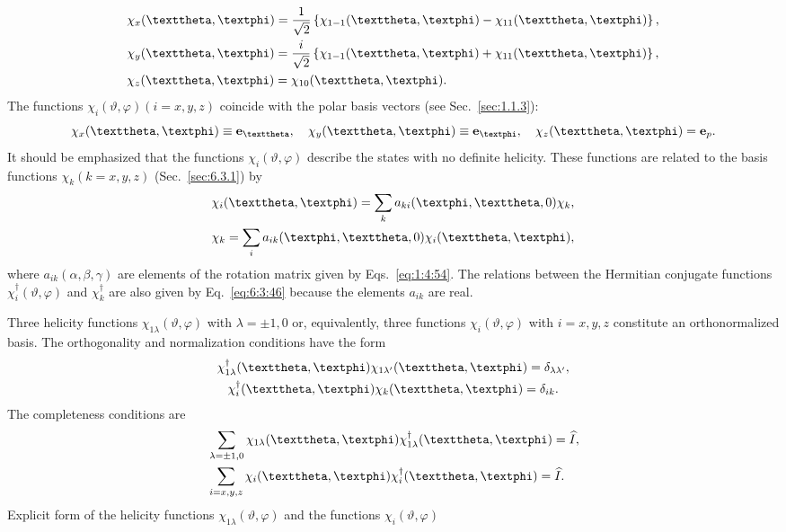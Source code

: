 \begin{align}
& \chi_{x}(\vartheta, \varphi)=\frac{1}{\sqrt{2}}\left\{\chi_{1-1}(\vartheta, \varphi)-\chi_{11}(\vartheta, \varphi)\right\}, \notag\\
& \chi_{y}(\vartheta, \varphi)=\frac{i}{\sqrt{2}}\left\{\chi_{1-1}(\vartheta, \varphi)+\chi_{11}(\vartheta, \varphi)\right\}, \label{eq:6:3:44}\\
& \chi_{z}(\vartheta, \varphi)=\chi_{10}(\vartheta, \varphi) . \notag
\end{align}
The functions $\chi_{i}(\vartheta, \varphi)(i=x, y, z)$ coincide with the polar basis vectors (see Sec.~\ref{sec:1.1.3}):
\begin{equation}
\chi_{x}(\vartheta, \varphi) \equiv \vect{e}_{\vartheta}, \quad \chi_{y}(\vartheta, \varphi) \equiv \vect{e}_{\varphi}, \quad \chi_{z}(\vartheta, \varphi)=\vect{e}_{p}. \label{eq:6:3:45}
\end{equation}
It should be emphasized that the functions $\chi_{i}(\vartheta, \varphi)$ describe the states with no definite helicity. These functions are related to the basis functions $\chi_{k}(k=x, y, z)$ (Sec.~\ref{sec:6.3.1}) by
\begin{align}
& \chi_{i}(\vartheta, \varphi)=\sum_{k} a_{k i}(\varphi, \vartheta, 0) \chi_{k}, \notag\\
& \chi_{k}=\sum_{i} a_{i k}(\varphi, \vartheta, 0) \chi_{i}(\vartheta, \varphi), \label{eq:6:3:46}
\end{align}
where $a_{i k}(\alpha, \beta, \gamma)$ are elements of the rotation matrix given by Eqs.~\eqref{eq:1:4:54}. The relations between the Hermitian conjugate functions $\chi_{i}^{\dagger}(\vartheta, \varphi)$ and $\chi_{k}^{\dagger}$ are also given by Eq.~\eqref{eq:6:3:46} because the elements $a_{i k}$ are real.

Three helicity functions $\chi_{1 \lambda}(\vartheta, \varphi)$ with $\lambda= \pm 1,0$ or, equivalently, three functions $\chi_{i}(\vartheta, \varphi)$ with $i=x, y, z$ constitute an orthonormalized basis. The orthogonality and normalization conditions have the form
\begin{gather}
\chi_{1 \lambda}^{\dagger}(\vartheta, \varphi) \chi_{1 \lambda^{\prime}}(\vartheta, \varphi)=\delta_{\lambda \lambda^{\prime}}, \notag\\
\chi_{i}^{\dagger}(\vartheta, \varphi) \chi_{k}(\vartheta, \varphi)=\delta_{i k} . \label{eq:6:3:47}
\end{gather}
The completeness conditions are
\begin{align}
& \sum_{\lambda= \pm 1,0} \chi_{1 \lambda}(\vartheta, \varphi) \chi_{1 \lambda}^{\dagger}(\vartheta, \varphi)=\widehat{I}, \notag\\
& \sum_{i=x, y, z} \chi_{i}(\vartheta, \varphi) \chi_{i}^{\dagger}(\vartheta, \varphi)=\widehat{I} . \label{eq:6:3:48}
\end{align}
Explicit form of the helicity functions $\chi_{1 \lambda}(\vartheta, \varphi)$ and the functions $\chi_{i}(\vartheta, \varphi)$\\
